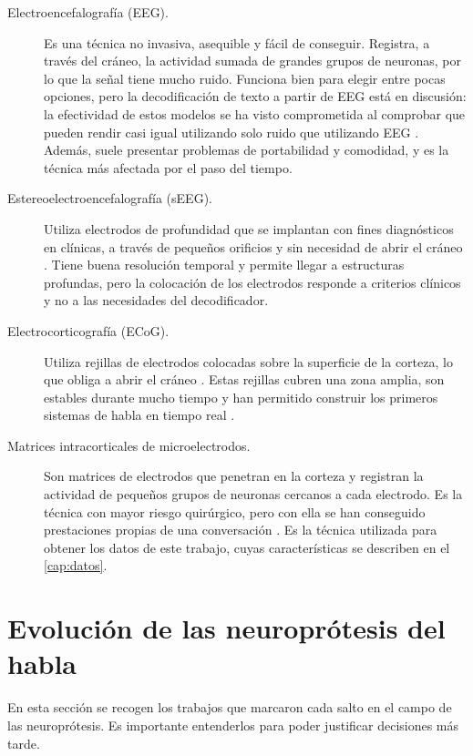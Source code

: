 \begin{description}
\item[Electroencefalografía (EEG).] Es una técnica no invasiva, asequible y fácil de conseguir. Registra, a través del cráneo, la actividad sumada de grandes grupos de neuronas, por lo que la señal tiene mucho ruido. Funciona bien para elegir entre pocas opciones, pero la decodificación de texto a partir de EEG está en discusión: la efectividad de estos modelos se ha visto comprometida al comprobar que pueden rendir casi igual utilizando solo ruido que utilizando EEG \cite{jo2024eegtotext}. Además, suele presentar problemas de portabilidad y comodidad, y es la técnica más afectada por el paso del tiempo.
\item[Estereoelectroencefalografía (sEEG).] Utiliza electrodos de profundidad que se implantan con fines diagnósticos en clínicas, a través de pequeños orificios y sin necesidad de abrir el cráneo \cite{verwoert2022}. Tiene buena resolución temporal y permite llegar a estructuras profundas, pero la colocación de los electrodos responde a criterios clínicos y no a las necesidades del decodificador.
\item[Electrocorticografía (ECoG).] Utiliza rejillas de electrodos colocadas sobre la superficie de la corteza, lo que obliga a abrir el cráneo \cite{kohler2022}. Estas rejillas cubren una zona amplia, son estables durante mucho tiempo y han permitido construir los primeros sistemas de habla en tiempo real \cite{moses2021,metzger2023}.
\item[Matrices intracorticales de microelectrodos.] Son matrices de electrodos que penetran en la corteza y registran la actividad de pequeños grupos de neuronas cercanos a cada electrodo. Es la técnica con mayor riesgo quirúrgico, pero con ella se han conseguido prestaciones propias de una conversación \cite{willett2023,card2024}. Es la técnica utilizada para obtener los datos de este trabajo, cuyas características se describen en el \cref{cap:datos}.
\end{description}

\section{Evolución de las neuroprótesis del habla}
\label{sec:sota-neuroprotesis}

En esta sección se recogen los trabajos que marcaron cada salto en el campo de las neuroprótesis. Es importante entenderlos para poder justificar decisiones más tarde.

